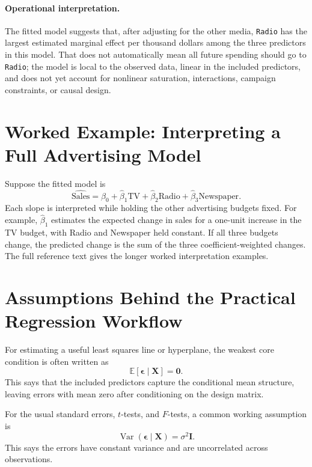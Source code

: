 {\paragraph{Operational interpretation.}
The fitted model suggests that, after adjusting for the other media, \texttt{Radio} has the largest estimated marginal effect per thousand dollars among the three predictors in this model.  That does not automatically mean all future spending should go to \texttt{Radio}; the model is local to the observed data, linear in the included predictors, and does not yet account for nonlinear saturation, interactions, campaign constraints, or causal design.
}{
\section{Worked Example: Interpreting a Full Advertising Model}

Suppose the fitted model is
\begin{equation}
  \widehat{\text{Sales}}
  =\widehat{\beta}_0+\widehat{\beta}_1\text{TV}+\widehat{\beta}_2\text{Radio}+\widehat{\beta}_3\text{Newspaper}.
\end{equation}
Each slope is interpreted while holding the other advertising budgets fixed.  For example, \(\widehat{\beta}_1\) estimates the expected change in sales for a one-unit increase in the TV budget, with Radio and Newspaper held constant.  If all three budgets change, the predicted change is the sum of the three coefficient-weighted changes.  The full reference text gives the longer worked interpretation examples.
}
\section{Assumptions Behind the Practical Regression Workflow}

For estimating a useful least squares line or hyperplane, the weakest core condition is often written as
\begin{equation}
  \mathbb{E}[\boldsymbol{\epsilon}\mid \mathbf{X}]=\mathbf{0}.
\end{equation}
This says that the included predictors capture the conditional mean structure, leaving errors with mean zero after conditioning on the design matrix.

For the usual standard errors, \(t\)-tests, and \(F\)-tests, a common working assumption is
\begin{equation}
  \operatorname{Var}(\boldsymbol{\epsilon}\mid\mathbf{X})=\sigma^2\mathbf{I}.
\end{equation}
This says the errors have constant variance and are uncorrelated across observations.

